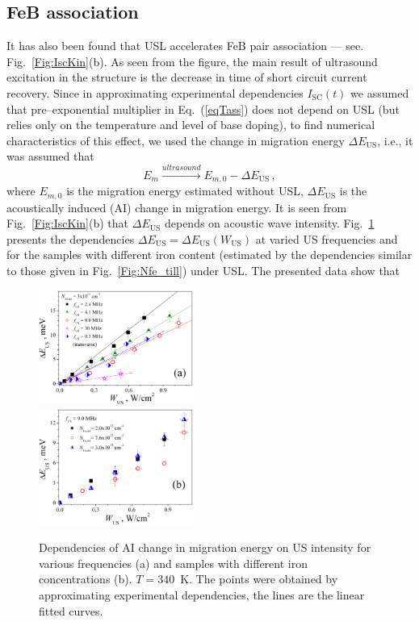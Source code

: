 \documentclass[%
 aip,jap,
 amsmath,amssymb,
 reprint,%
]{revtex4-1}
\begin{document}
\subsection{\label{sec:FeBass}FeB association}

It has also been found that USL accelerates FeB pair association --–
see. Fig.~\ref{Fig:IscKin}(b).
As seen from the figure, the main result of ultrasound excitation in the structure
is the decrease in time of short circuit current recovery.
Since in approximating experimental dependencies $I_\mathrm{SC}(t)$ we assumed that pre--exponential multiplier in Eq.~(\ref{eqTass}) does not depend on USL
(but relies only on the temperature and level of base doping),
to find numerical characteristics of this effect,
we used the change in migration energy $\Delta E_\mathrm{US}$, i.e., it was assumed that
\begin{equation}
\label{eqEmUs}
E_m \xrightarrow{ultrasound} E_{m,0}-\Delta E_\mathrm{US}\,,
\end{equation}
where $E_{m,0}$ is the migration energy estimated without USL,
$\Delta E_\mathrm{US}$ is the acoustically induced (AI) change in migration energy.
It is seen from Fig.~\ref{Fig:IscKin}(b)
that $\Delta E_\mathrm{US}$ depends on acoustic wave intensity.
Fig.~\ref{Fig:EmWus} presents the dependencies $\Delta E_\mathrm{US}=\Delta E_\mathrm{US}(W_\mathrm{US})$ at varied US frequencies and for the samples with different iron content
(estimated by the dependencies similar to those given in Fig.~\ref{Fig:Nfe_till}) under USL.
The presented data show that

\begin{figure}
\includegraphics[width=0.45\textwidth]{Fig6a}\\%
\includegraphics[width=0.45\textwidth]{Fig6b}%
\caption{\label{Fig:EmWus}
Dependencies of AI change in migration energy on US intensity for various
frequencies (a) and samples with different  iron concentrations (b).
$T=340$~K.
The points were obtained by approximating experimental dependencies,
the lines are the linear fitted curves.
}
\end{figure}
\end{document}
